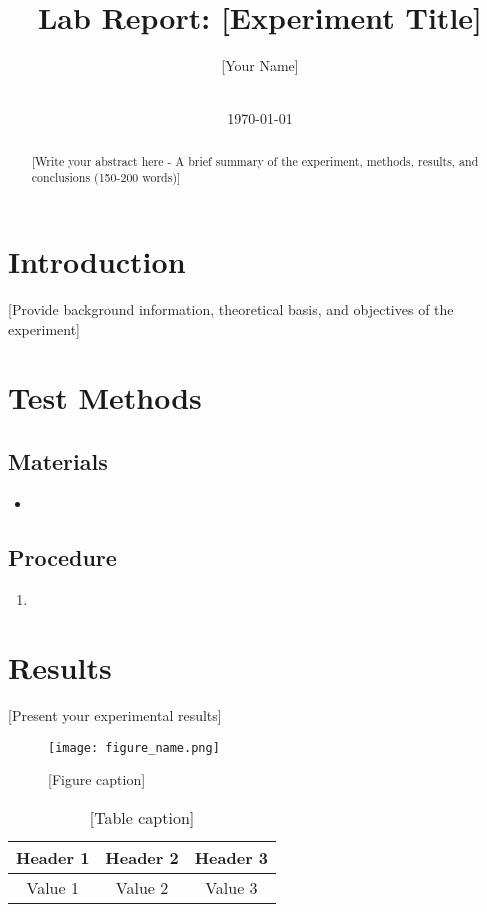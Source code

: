 \documentclass[12pt]{article}
\title{Lab Report: [Experiment Title]}
\author{[Your Name]\\[Course Name]\\[Institution]}
\date{\today}
\begin{document}
\maketitle

\begin{abstract}
[Write your abstract here - A brief summary of the experiment, methods, results, and conclusions (150-200 words)]
\end{abstract}

\section{Introduction}
[Provide background information, theoretical basis, and objectives of the experiment]

\section{Test Methods}
\subsection{Materials}
\begin{itemize}
    \item [List materials used]
\end{itemize}

\subsection{Procedure}
\begin{enumerate}
    \item [Detail the experimental steps]
\end{enumerate}

\section{Results}
[Present your experimental results]

\begin{figure}[H]
    \centering
    \texttt{[image: figure\_name.png]}
    \caption{[Figure caption]}
    \label{fig:example}
\end{figure}

\begin{table}[H]
    \centering
    \begin{tabular}{|c|c|c|}
        \hline
        Header 1 & Header 2 & Header 3 \\
        \hline
        Value 1 & Value 2 & Value 3 \\
        \hline
    \end{tabular}
    \caption{[Table caption]}
    \label{tab:example}
\end{table}
\end{document}
